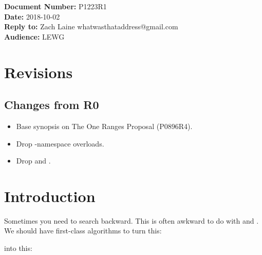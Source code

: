 \documentclass{article}
\begin{document}
\title{\textbf{\Large {}}}
\date{}
{\let\newpage\relax\maketitle}

\noindent\textbf{Document Number:} P1223R1\\
\textbf{Date:} 2018-10-02\\
\textbf{Reply to:} Zach Laine whatwasthataddress@gmail.com\\
\textbf{Audience:} LEWG

\section{Revisions}

\subsection{Changes from R0}

\begin{itemize}
  \item Base synopsis on The One Ranges Proposal (P0896R4).
  \item Drop -namespace overloads.
  \item Drop  and .
\end{itemize}

\section{Introduction}

\label{sec:intro}

Sometimes you need to search backward.  This is often awkward to do with
 and .  We should have first-class
algorithms to turn this:



into this:





\end{document}
